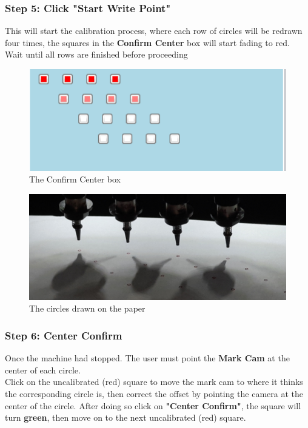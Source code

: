 \documentclass[a4paper,10pt]{report}
\begin{document}
\subsubsection{Step 5: Click "Start Write Point" }
This will start the calibration process, where each row of circles will be redrawn four times, the squares in the \textbf{Confirm Center} box will start fading to red. Wait until all rows are finished before proceeding
 \begin{figure}[!htb]
 \centering
 \includegraphics[width=1\textwidth]{images/scrot36.png}
 \caption{The Confirm Center box}
\end{figure}
 \begin{figure}[!htb]
 \centering
 \includegraphics[width=1\textwidth]{images/circles.png}
 \caption{The circles drawn on the paper}
\end{figure}
\newpage
\subsubsection{Step 6: Center Confirm}
Once the machine had stopped. The user must point the \textbf{Mark Cam} at the center of each circle.\\
Click on the uncalibrated (red) square to move the mark cam to where it thinks the corresponding circle is, then correct the offset by pointing the camera at the center of the circle. After doing so click on \textbf{"Center Confirm"}, the square will turn \textbf{green}, then move on to the next uncalibrated (red) square.\\
\end{document}
